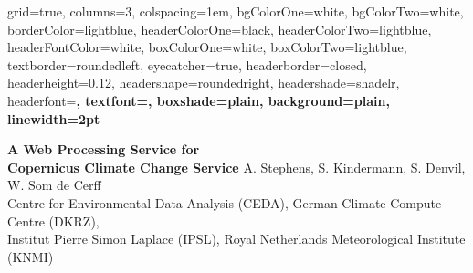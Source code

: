 \documentclass[portrait,a0paper]{baposter}
\begin{document}


\begin{poster}%
  {
  grid=true,
  columns=3,
  colspacing=1em,
  bgColorOne=white,
  bgColorTwo=white,
  borderColor=lightblue,
  headerColorOne=black,
  headerColorTwo=lightblue,
  headerFontColor=white,
  boxColorOne=white,
  boxColorTwo=lightblue,
  textborder=roundedleft,
  eyecatcher=true,
  headerborder=closed,
  headerheight=0.12\textheight,
  headershape=roundedright,
  headershade=shadelr,
  headerfont=\Large\bf\textsc, %
  textfont={\setlength{\parindent}{1.5em}},
  boxshade=plain,
  background=plain,
  linewidth=2pt
  }
  {

  }
  {\sf\bf
          A Web Processing Service for\\ Copernicus Climate Change Service
  }
  {
    \vspace{1em} A. Stephens, S. Kindermann, S. Denvil, W. Som de Cerff\\
    {\smaller Centre for Environmental Data Analysis (CEDA),
    German Climate Compute Centre (DKRZ),\\
    Institut Pierre Simon Laplace (IPSL),
    Royal Netherlands Meteorological Institute (KNMI)}
  }
  {

  }



\end{poster}
\end{document}

